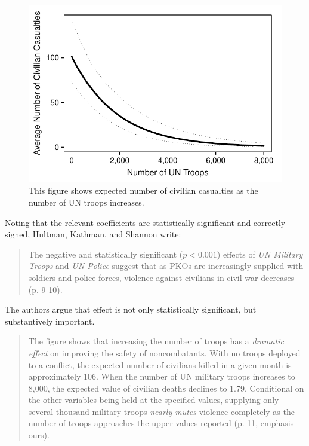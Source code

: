 \documentclass[12pt]{article}
\begin{document}
\begin{figure}[H]
\begin{center}
\includegraphics[scale = .8]{figs/hks-ev.pdf}
\caption{This figure shows expected number of civilian casualties as the number of UN troops increases.}\label{fig:hks-ev}
\end{center}
\end{figure}

Noting that the relevant coefficients are statistically significant and correctly signed, Hultman, Kathman, and Shannon write:

\begin{quote}
The negative and statistically significant ($p < 0.001$) effects of \textit{UN Military Troops} and \textit{UN Police} suggest that as PKOs are increasingly supplied with soldiers and police forces, violence against civilians in civil war decreases (p. 9-10).
\end{quote}

The authors argue that effect is not only statistically significant, but substantively important.

\begin{quote}
The figure shows that increasing the number of troops has a \emph{dramatic effect} on improving the safety of noncombatants. With no troops deployed to a conflict, the expected number of civilians killed in a given month is approximately 106. When the number of UN military troops increases to 8,000, the expected value of civilian deaths declines to 1.79. Conditional on the other variables being held at the specified values, supplying only several thousand military troops \emph{nearly mutes} violence completely as the number of troops approaches the upper values reported (p. 11, emphasis ours).
\end{quote}
\end{document}
